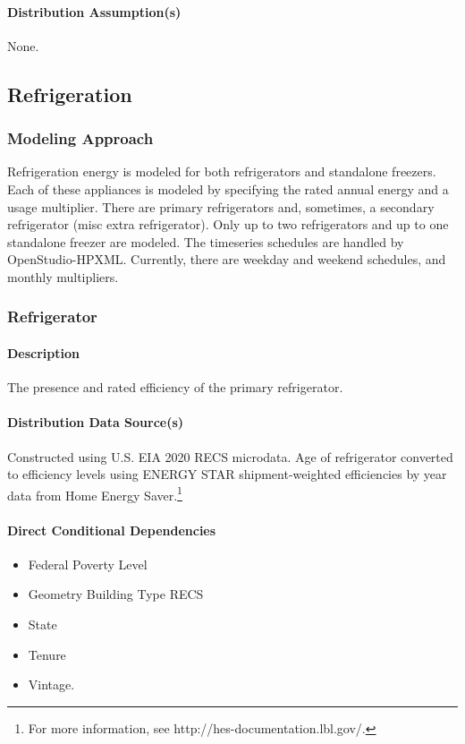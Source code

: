 \paragraph{Distribution Assumption(s)}
None.

\subsection{Refrigeration}
\subsubsection{Modeling Approach}
Refrigeration energy is modeled for both refrigerators and standalone freezers. Each of these appliances is modeled by specifying the rated annual energy and a usage multiplier. There are primary refrigerators and, sometimes, a secondary refrigerator (misc extra refrigerator). Only up to two refrigerators and up to one standalone freezer are modeled. The timeseries schedules are handled by OpenStudio-HPXML. Currently, there are weekday and weekend schedules, and monthly multipliers.

\subsubsection{Refrigerator}
\paragraph{Description}
The presence and rated efficiency of the primary refrigerator.
\paragraph{Distribution Data Source(s)}
Constructed using U.S. EIA 2020 RECS microdata. Age of refrigerator converted to efficiency levels using ENERGY STAR shipment-weighted efficiencies by year data from Home Energy Saver.\footnote{For more information, see http://hes-documentation.lbl.gov/.} 
\paragraph{Direct Conditional Dependencies}
\begin{itemize}
    \item Federal Poverty Level
    \item Geometry Building Type RECS
    \item State
    \item Tenure
    \item Vintage.
\end{itemize} 
